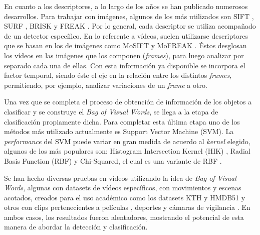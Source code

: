 En cuanto a los descriptores, a lo largo de los años se han publicado numerosos desarrollos. Para trabajar con imágenes, algunos de los más utilizados
son SIFT \parencite{lowe2004distinctive}, SURF \parencite{bay2006surf}, BRISK \parencite{leutenegger2011brisk} y FREAK \parencite{alahi2012freak}.
Por lo general, cada descriptor se utiliza acompañado de un detector específico.
En lo referente a vídeos, suelen utilizarse descriptores que se basan en los de imágenes como MoSIFT \parencite{chen2009mosift} y
MoFREAK \parencite{whiten2013mofreak}. Éstos desglosan los vídeos en las imágenes que los componen (\textit{frames}), para luego analizar por separado
cada una de ellas. Con esta información ya disponible se incorpora el factor temporal, siendo éste el eje en la relación entre los distintos \textit{frames},
permitiendo, por ejemplo, analizar variaciones de un \textit{frame} a otro.


Una vez que se completa el proceso de obtención de información de los objetos a clasificar y se construye el \textit{Bag of Visual
Words}, se llega a la etapa de clasificación propiamente dicha. Para completar esta última etapa uno de los métodos más utilizado
actualmente es Support Vector Machine (SVM). La \textit{performance} del SVM puede variar en gran medida de acuerdo al \textit{kernel}
elegido, algunos de los más populares son: Histogram Intersection Kernel (HIK) \parencite{barla2003histogram}, Radial Basis Function (RBF) y Chi-Squared,
el cual es una variante de RBF \parencite{whiten2013mofreak, nievas2011violence}.

Se han hecho diversas pruebas en vídeos utilizando la idea de \textit{Bag of Visual Words}, algunas con
datasets de vídeos específicos, con movimientos y escenas acotados, creados para el uso académico como los datasets KTH \parencite{schuldt2004recognizing}
y HMDB51 \parencite{kuehne2011hmdb} \parencite{chen2009mosift, whiten2013mofreak} y otros con clips pertenecientes a películas \parencite{chen2011violence}, deportes
 \parencite{nievas2011violence, deniz2014fast} y cámaras de vigilancia \parencite{chen2009mosift}. En ambos casos, los resultados fueron alentadores, mostrando el
potencial de esta manera de abordar la detección y clasificación.